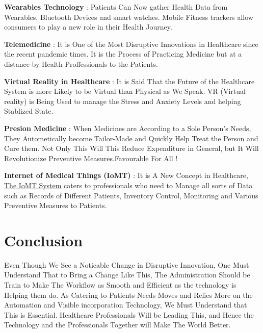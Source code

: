 \documentclass[12pt]{article}
\begin{document}
\textbf{ Wearables Technology }: Patients Can Now gather Health Data from Wearables, Bluetooth Devices and smart watches. Mobile Fitness trackers allow consumers to play a new role in their Health Journey.

\textbf{ Telemedicine }: It is One of the Most Disruptive Innovations in Healthcare since the recent pandemic times.
 It is the Process of Practicing Medicine but at a distance by Health Proffessionals to the Patients.

\textbf{ Virtual Reality in Healthcare} : It is Said That the Future of the Healthcare System is more Likely to be Virtual than Physical as We Speak.
VR (Virtual reality) is Being Used to manage the Stress and Anxiety Levels and helping Stablized State.

\textbf{ Presion Medicine }: When Medicines  are According to a Sole Person's Needs, They Autometically become Tailor-Made and Quickly Help Treat the Person and Cure them. Not Only This Will This Reduce Expenditure in General, but It Will Revolutionize Preventive Measures.Favourable For All !

\textbf{ Internet of Medical Things (IoMT)} : It is A New Concept in Healthcare, \href{https://www.technewsworld.com/story/the-internet-of-medical-things-part-1-a-new-concept-in-healthcare-83654.html}{The IoMT System} caters to professionals who need to Manage all sorts of Data such as Records of Different Patients, Inventory Control, Monitoring and Various Preventive Measures to Patients.

\section{Conclusion}
Even Though We See a Noticable Change in Disruptive Innovation, One Must Understand That to Bring a Change Like This,
 The Administration Should be Train to Make The Workflow as Smooth and Efficient as the technology is Helping them do.
 As Catering to Patients Needs Moves and Relies More on the Automation and Visible incorporation Technology, We Must Understand that This is Essential.
 Healthcare Professionals Will be Leading This, and Hence the Technology and the Professionals Together will Make The World Better.
\end{document}
